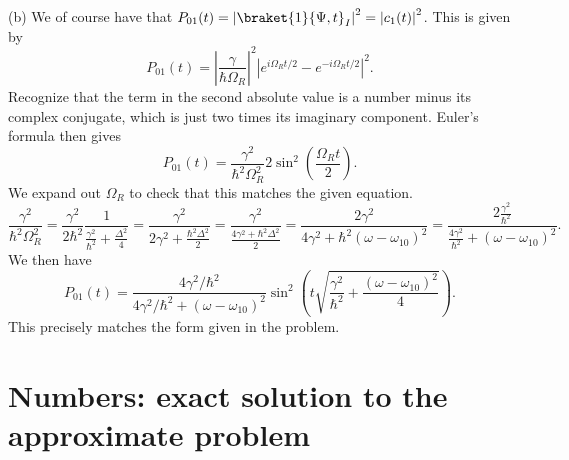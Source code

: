 \documentclass[11pt, letterpaper]{article}
\begin{document}
(b) We of course have that $P_{01}(t) =\left| \braket{1}{\Psi ,t}_I \right|^2=\left| c_1(t) \right| ^2 $. This is given by
\[
	P_{01} (t)=\left| \frac{\gamma }{\hbar\Omega _R}  \right| ^2 \left| e^{i\Omega _Rt/2} -e^{-i\Omega _Rt/2}  \right| ^2
.\]
Recognize that the term in the second absolute value is a number minus its complex conjugate, which is just two times its imaginary component. Euler's formula then gives
\[
	P_{01} (t)=\frac{\gamma ^2}{\hbar^2 \Omega _R^2} 2 \sin^2 \left( \frac{\Omega _Rt}{2}  \right) 
.\]
We expand out $\Omega _R$ to check that this matches the given equation.
\[
	\frac{\gamma ^2}{\hbar^2\Omega _R^2} =\frac{\gamma ^2}{2\hbar^2} \frac{1}{\frac{\gamma ^2}{\hbar^2} +\frac{\Delta^2}{4} } =\frac{\gamma ^2}{2\gamma ^2+\frac{\hbar^2\Delta^2 }{2} } =\frac{\gamma ^2}{\frac{4\gamma ^2+\hbar^2\Delta^2 }{2} } =\frac{2\gamma ^2}{4\gamma ^2+\hbar^2(\omega -\omega _{10} )^2} = \frac{2\frac{\gamma ^2}{\hbar^2} }{\frac{4\gamma ^2}{\hbar^2} +(\omega -\omega _{10} )^2	} 
.\]
We then have
\[
	P_{01} (t)=\frac{4\gamma ^2/\hbar^2}{4\gamma ^2/\hbar^2+(\omega -\omega _{10} )^2} \sin ^2\left( t\sqrt{\frac{\gamma ^2}{\hbar^2} +\frac{(\omega -\omega _{10} )^2}{4} }  \right) 
.\]
This precisely matches the form given in the problem.



\section{Numbers: exact solution to the approximate problem}
\end{document}
